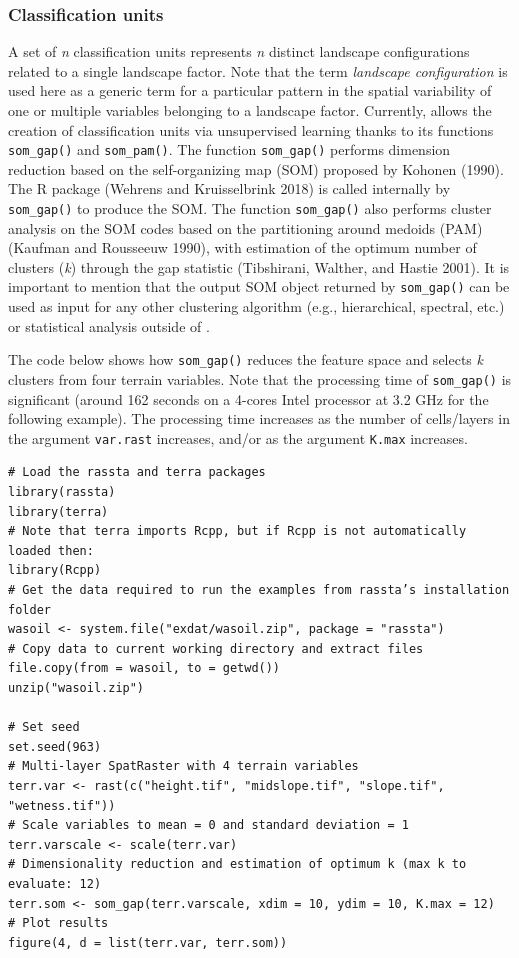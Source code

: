 \hypertarget{classification-units}{%
\subsubsection{Classification units}\label{classification-units}}

A set of \emph{n} classification units represents \emph{n} distinct landscape
configurations related to a single landscape factor. Note that the term
\emph{landscape configuration} is used here as a generic term for a particular
pattern in the spatial variability of one or multiple variables belonging to a
landscape factor. Currently,  allows the creation of classification
units via unsupervised learning thanks to its functions \texttt{som\_gap()} and
\texttt{som\_pam()}. The function \texttt{som\_gap()} performs dimension reduction based on the
self-organizing map (SOM) proposed by Kohonen (1990). The R package
 (Wehrens and Kruisselbrink 2018) is called internally by \texttt{som\_gap()} to produce
the SOM. The function \texttt{som\_gap()} also performs cluster analysis on the SOM
codes based on the partitioning around medoids (PAM) (Kaufman and Rousseeuw 1990), with
estimation of the optimum number of clusters (\emph{k}) through the gap statistic
(Tibshirani, Walther, and Hastie 2001). It is important to mention that the output SOM object
returned by \texttt{som\_gap()} can be used as input for any other clustering algorithm
(e.g., hierarchical, spectral, etc.) or statistical analysis outside of
.

The code below shows how \texttt{som\_gap()} reduces the feature space and selects \emph{k}
clusters from four terrain variables. Note that the processing time of
\texttt{som\_gap()} is significant (around 162 seconds on a 4-cores Intel processor at
3.2 GHz for the following example). The processing time increases as the number
of cells/layers in the argument \texttt{var.rast} increases, and/or as the argument
\texttt{K.max} increases.

\begin{verbatim}
# Load the rassta and terra packages
library(rassta)
library(terra)
# Note that terra imports Rcpp, but if Rcpp is not automatically loaded then:
library(Rcpp)
# Get the data required to run the examples from rassta’s installation folder
wasoil <- system.file("exdat/wasoil.zip", package = "rassta")
# Copy data to current working directory and extract files
file.copy(from = wasoil, to = getwd())
unzip("wasoil.zip")

# Set seed
set.seed(963)
# Multi-layer SpatRaster with 4 terrain variables
terr.var <- rast(c("height.tif", "midslope.tif", "slope.tif", "wetness.tif"))
# Scale variables to mean = 0 and standard deviation = 1
terr.varscale <- scale(terr.var)
# Dimensionality reduction and estimation of optimum k (max k to evaluate: 12)
terr.som <- som_gap(terr.varscale, xdim = 10, ydim = 10, K.max = 12)
# Plot results
figure(4, d = list(terr.var, terr.som))
\end{verbatim}

